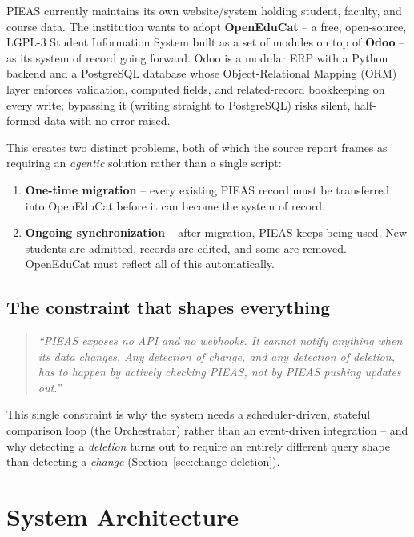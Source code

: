 \documentclass[11pt,a4paper]{article}
\begin{document}
PIEAS currently maintains its own website/system holding student, faculty, and course data.
The institution wants to adopt \textbf{OpenEduCat} -- a free, open-source, LGPL-3 Student
Information System built as a set of modules on top of \textbf{Odoo} -- as its system of record
going forward. Odoo is a modular ERP with a Python backend and a PostgreSQL database whose
Object-Relational Mapping (ORM) layer enforces validation, computed fields, and related-record
bookkeeping on every write; bypassing it (writing straight to PostgreSQL) risks silent,
half-formed data with no error raised.

This creates two distinct problems, both of which the source report frames as requiring an
\emph{agentic} solution rather than a single script:

\begin{enumerate}[leftmargin=1.4em]
    \item \textbf{One-time migration} -- every existing PIEAS record must be transferred into
          OpenEduCat before it can become the system of record.
    \item \textbf{Ongoing synchronization} -- after migration, PIEAS keeps being used. New
          students are admitted, records are edited, and some are removed. OpenEduCat must
          reflect all of this automatically.
\end{enumerate}

\subsection{The constraint that shapes everything}

\begin{quote}
\itshape
``PIEAS exposes no API and no webhooks. It cannot notify anything when its data changes. Any
detection of change, and any detection of deletion, has to happen by actively checking PIEAS,
not by PIEAS pushing updates out.''
\end{quote}

This single constraint is why the system needs a scheduler-driven, stateful comparison loop
(the Orchestrator) rather than an event-driven integration -- and why detecting a
\emph{deletion} turns out to require an entirely different query shape than detecting a
\emph{change} (Section~\ref{sec:change-deletion}).

\section{System Architecture}
\end{document}

